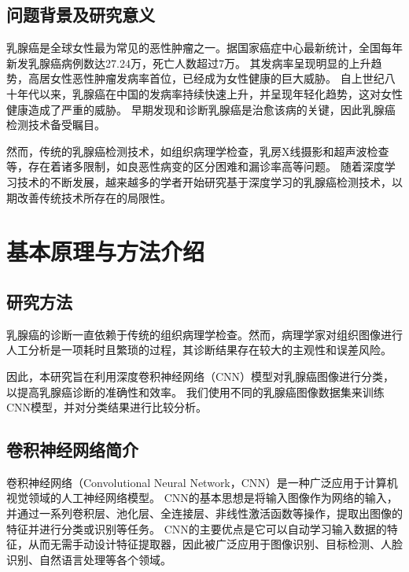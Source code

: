 \documentclass[AutoFakeBold]{LZUThesis}
\begin{document}


\section{问题背景及研究意义}

乳腺癌是全球女性最为常见的恶性肿瘤之一。据国家癌症中心最新统计，全国每年新发乳腺癌病例数达27.24万，死亡人数超过7万。
其发病率呈现明显的上升趋势，高居女性恶性肿瘤发病率首位，已经成为女性健康的巨大威胁。
自上世纪八十年代以来，乳腺癌在中国的发病率持续快速上升，并呈现年轻化趋势，这对女性健康造成了严重的威胁。
早期发现和诊断乳腺癌是治愈该病的关键，因此乳腺癌检测技术备受瞩目。

然而，传统的乳腺癌检测技术，如组织病理学检查，乳房X线摄影和超声波检查等，存在着诸多限制，如良恶性病变的区分困难和漏诊率高等问题。
随着深度学习技术的不断发展，越来越多的学者开始研究基于深度学习的乳腺癌检测技术，以期改善传统技术所存在的局限性。



\chapter{基本原理与方法介绍}
\section{研究方法}
乳腺癌的诊断一直依赖于传统的组织病理学检查。然而，病理学家对组织图像进行人工分析是一项耗时且繁琐的过程，其诊断结果存在较大的主观性和误差风险。

因此，本研究旨在利用深度卷积神经网络（CNN）模型对乳腺癌图像进行分类，以提高乳腺癌诊断的准确性和效率。
我们使用不同的乳腺癌图像数据集来训练CNN模型，并对分类结果进行比较分析。

\section{卷积神经网络简介}
卷积神经网络（Convolutional Neural Network，CNN）是一种广泛应用于计算机视觉领域的人工神经网络模型。
CNN的基本思想是将输入图像作为网络的输入，并通过一系列卷积层、池化层、全连接层、非线性激活函数等操作，提取出图像的特征并进行分类或识别等任务。
CNN的主要优点是它可以自动学习输入数据的特征，从而无需手动设计特征提取器，因此被广泛应用于图像识别、目标检测、人脸识别、自然语言处理等各个领域。
\end{document}
